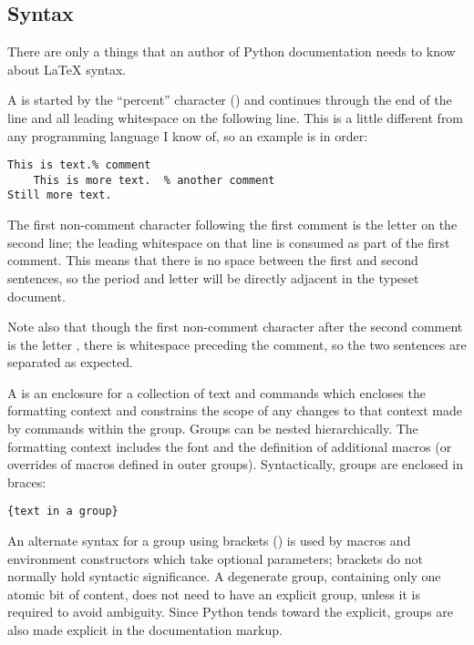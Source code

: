 \documentclass{howto}
\begin{document}
  \subsection{Syntax}

    There are only a things that an author of Python documentation
    needs to know about \LaTeX{} syntax.

    A  is started by the ``percent'' character
    (\character{\%}) and continues through the end of the line and all
    leading whitespace on the following line.  This is a little
    different from any programming language I know of, so an example
    is in order:

\begin{verbatim}
This is text.% comment
    This is more text.  % another comment
Still more text.
\end{verbatim}

    The first non-comment character following the first comment is the
    letter  on the second line; the leading whitespace on
    that line is consumed as part of the first comment.  This means
    that there is no space between the first and second sentences, so
    the period and letter  will be directly adjacent in
    the typeset document.

    Note also that though the first non-comment character after the
    second comment is the letter , there is whitespace
    preceding the comment, so the two sentences are separated as
    expected.

    A  is an enclosure for a collection of text and
    commands which encloses the formatting context and constrains the
    scope of any changes to that context made by commands within the
    group.  Groups can be nested hierarchically.  The formatting
    context includes the font and the definition of additional macros
    (or overrides of macros defined in outer groups).  Syntactically,
    groups are enclosed in braces:

\begin{verbatim}
{text in a group}
\end{verbatim}

    An alternate syntax for a group using brackets () is
    used by macros and environment constructors which take optional
    parameters; brackets do not normally hold syntactic significance.
    A degenerate group, containing only one atomic bit of content,
    does not need to have an explicit group, unless it is required to
    avoid ambiguity.  Since Python tends toward the explicit, groups
    are also made explicit in the documentation markup.
\end{document}
